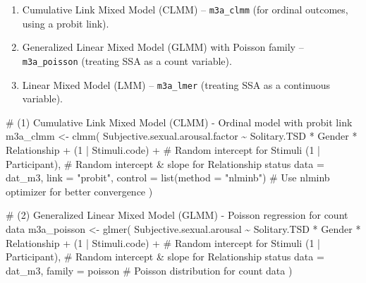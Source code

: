 \documentclass[
  bookmarksnumbered]{article}
\newenvironment{Shaded}{\begin{snugshade}}{\end{snugshade}}
\newcommand{\AttributeTok}[1]{\textcolor[rgb]{0.80,0.80,0.80}{#1}}
\newcommand{\CommentTok}[1]{\textcolor[rgb]{0.50,0.62,0.50}{#1}}
\newcommand{\DecValTok}[1]{\textcolor[rgb]{0.86,0.86,0.80}{#1}}
\newcommand{\FunctionTok}[1]{\textcolor[rgb]{0.94,0.94,0.56}{#1}}
\newcommand{\NormalTok}[1]{\textcolor[rgb]{0.80,0.80,0.80}{#1}}
\newcommand{\OtherTok}[1]{\textcolor[rgb]{0.94,0.94,0.56}{#1}}
\newcommand{\SpecialCharTok}[1]{\textcolor[rgb]{0.86,0.64,0.64}{#1}}
\newcommand{\StringTok}[1]{\textcolor[rgb]{0.80,0.58,0.58}{#1}}
\providecommand{\tightlist}{%
  \setlength{\itemsep}{0pt}\setlength{\parskip}{0pt}}
\begin{document}
\begin{enumerate}
\def\labelenumi{\arabic{enumi}.}
\tightlist
\item
  Cumulative Link Mixed Model (CLMM) -- \texttt{m3a\_clmm} (for ordinal outcomes, using a probit link).
\item
  Generalized Linear Mixed Model (GLMM) with Poisson family -- \texttt{m3a\_poisson} (treating SSA as a count variable).
\item
  Linear Mixed Model (LMM) -- \texttt{m3a\_lmer} (treating SSA as a continuous variable).
\end{enumerate}

\begin{Shaded}
\begin{Highlighting}[]
\CommentTok{\# (1) Cumulative Link Mixed Model (CLMM) {-} Ordinal model with probit link}
\NormalTok{m3a\_clmm }\OtherTok{\textless{}{-}} \FunctionTok{clmm}\NormalTok{(}
\NormalTok{  Subjective.sexual.arousal.factor }\SpecialCharTok{\textasciitilde{}}\NormalTok{ Solitary.TSD }\SpecialCharTok{*}\NormalTok{ Gender }\SpecialCharTok{*}\NormalTok{ Relationship }\SpecialCharTok{+}
\NormalTok{    (}\DecValTok{1} \SpecialCharTok{|}\NormalTok{ Stimuli.code) }\SpecialCharTok{+} \CommentTok{\# Random intercept for Stimuli}
\NormalTok{    (}\DecValTok{1} \SpecialCharTok{|}\NormalTok{ Participant), }\CommentTok{\# Random intercept \& slope for Relationship status}
  \AttributeTok{data =}\NormalTok{ dat\_m3,}
  \AttributeTok{link =} \StringTok{"probit"}\NormalTok{,}
  \AttributeTok{control =} \FunctionTok{list}\NormalTok{(}\AttributeTok{method =} \StringTok{"nlminb"}\NormalTok{) }\CommentTok{\# Use \textquotesingle{}nlminb\textquotesingle{} optimizer for better convergence}
\NormalTok{)}

\CommentTok{\# (2) Generalized Linear Mixed Model (GLMM) {-} Poisson regression for count data}
\NormalTok{m3a\_poisson }\OtherTok{\textless{}{-}} \FunctionTok{glmer}\NormalTok{(}
\NormalTok{  Subjective.sexual.arousal }\SpecialCharTok{\textasciitilde{}}\NormalTok{ Solitary.TSD }\SpecialCharTok{*}\NormalTok{ Gender }\SpecialCharTok{*}\NormalTok{ Relationship }\SpecialCharTok{+}
\NormalTok{    (}\DecValTok{1} \SpecialCharTok{|}\NormalTok{ Stimuli.code) }\SpecialCharTok{+} \CommentTok{\# Random intercept for Stimuli}
\NormalTok{    (}\DecValTok{1} \SpecialCharTok{|}\NormalTok{ Participant), }\CommentTok{\# Random intercept \& slope for Relationship status}
  \AttributeTok{data =}\NormalTok{ dat\_m3,}
  \AttributeTok{family =}\NormalTok{ poisson }\CommentTok{\# Poisson distribution for count data}
\NormalTok{)}


\end{Highlighting}
\end{Shaded}
\end{document}
